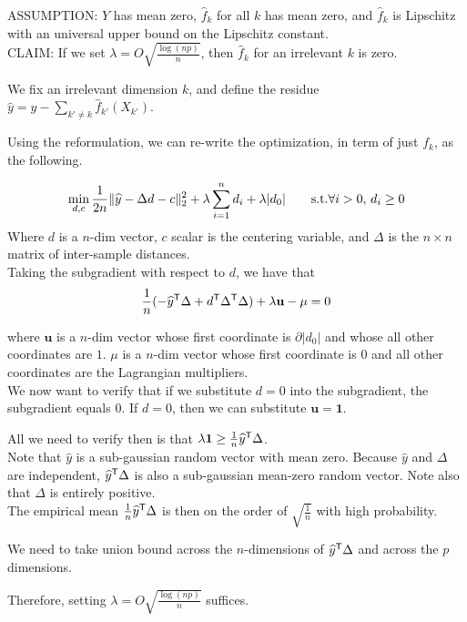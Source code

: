 \documentclass{article}
\begin{document}
ASSUMPTION: $Y$ has mean zero, $\hat{f}_k$ for all $k$ has mean zero, and $\hat{f}_k$ is Lipschitz with an universal upper bound on the Lipschitz constant.\\

CLAIM: If we set $\lambda = O \sqrt{\frac{\log (np) }{ n }}$, then $\hat{f}_k$ for an irrelevant $k$ is zero.

We fix an irrelevant dimension $k$, and define the residue $\hat{y} = y - \sum_{k' \neq k} \hat{f}_{k'}(X_{k'})$.

Using the reformulation, we can re-write the optimization, in term of just $f_k$, as the following.

\[
\min_{d, c}  \frac{1}{2n} \| \widehat{y} - \Delta d - c \|_2^2 + \lambda \sum_{i=1}^n d_i + \lambda|d_0|  \qquad \textrm{s.t.} \forall i>0, \, d_i \geq 0
\]
Where $d$ is a $n$-dim vector, $c$ scalar is the centering variable, and $\Delta$ is the $n \times n$ matrix of inter-sample distances.\\

Taking the subgradient with respect to $d$, we have that
\[
\frac{1}{n} (-\widehat{y}^{\mathsf{T}} \Delta + d^{\mathsf{T}} \Delta^{\mathsf{T}} \Delta ) + \lambda \mathbf{u} - \mu = 0
\]

where $\mathbf{u}$ is a $n$-dim vector whose first coordinate is $\partial | d_0 |$ and whose all other coordinates are $1$. $\mu$ is a $n$-dim vector whose first coordinate is $0$ and all other coordinates are the Lagrangian multipliers.\\

We now want to verify that if we substitute $d = 0$ into the subgradient, the subgradient equals 0. If $d=0$, then we can substitute $\mathbf{u} = \mathbf{1}$.

All we need to verify then is that $\lambda \mathbf{1} \geq \frac{1}{n} \widehat{y}^{\mathsf{T}} \Delta$.\\

Note that $\hat{y}$ is a sub-gaussian random vector with mean zero. Because $\hat{y}$ and $\Delta$ are independent, $\widehat{y}^{\mathsf{T}} \Delta$ is also a sub-gaussian mean-zero random vector. Note also that $\Delta$ is entirely positive.\\

The empirical mean $ \frac{1}{n} \widehat{y}^{\mathsf{T}} \Delta$ is then on the order of $\sqrt{ \frac{1}{n}}$ with high probability.

We need to take union bound across the $n$-dimensions of $\widehat{y}^{\mathsf{T}} \Delta$ and across the $p$ dimensions. 

Therefore, setting $\lambda = O \sqrt{\frac{\log (np)}{n}}$ suffices.
\end{document}
